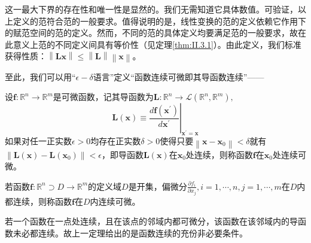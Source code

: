 \documentclass[main.tex]{subfiles}
\begin{document}
这一最大下界的存在性和唯一性是显然的。我们无需知道它具体数值。可验证，以上定义的范符合范的一般要求。值得说明的是，线性变换的范的定义依赖它作用下的赋范空间的范的定义。然而，不同的范的具体定义均要满足范的一般要求，故在此意义上范的不同定义间具有等价性（见定理\ref{thm:II.3.1}）。由此定义，我们标准获得性质：$\left\|\mathbf{Lx}\right\|\leq\left\|\mathbf{L}\right\|\left\|\mathbf{x}\right\|$。

至此，我们可以用“$\epsilon-\delta$语言”定义“函数连续可微即其导函数连续”——

\begin{definition}[连续可微]
设$\mathbf{f}:\mathbb{R}^n\rightarrow\mathbb{R}^m$是可微函数，记其导函数为$\mathbf{L}:\mathbb{R}^n\rightarrow\mathcal{L}\left(\mathbb{R}^n,\mathbb{R}^m\right),$
\[
\mathbf{L}\left(\mathbf{x}\right)\equiv\left.\frac{d\mathbf{f}\left(\mathbf{x}^\prime\right)}{d\mathbf{x}^\prime}\right|_{\mathbf{x^\prime}=\mathbf{x}}
\]
如果对任一正实数$\epsilon>0$均存在正实数$\delta>0$使得只要$\left\|\mathbf{x}-\mathbf{x}_0\right\|<\delta$就有$\left\|\mathbf{L}\left(\mathbf{x}\right)-\mathbf{L}\left(\mathbf{x}_0\right)\right\|<\epsilon$，即导函数$\mathbf{L}\left(\mathbf{x}\right)$在$\mathbf{x}_0$处连续，则称函数$\mathbf{f}$在$\mathbf{x}_0$处连续可微。
\end{definition}

\begin{theorem}
若函数$\mathbf{f}:\mathbb{R}^n\supset D\rightarrow\mathbb{R}^m$的定义域$D$是开集，偏微分$\frac{\partial f_i}{\partial x_j},i=1,\cdots,n,j=1,\cdots,m$在$D$内都连续，则称函数$\mathbf{f}$在$D$内连续可微。
\end{theorem}

若一个函数在一点处连续，且在该点的邻域内都可微分，该函数在该邻域内的导函数未必都连续。故上一定理给出的是函数连续的充份非必要条件。
\end{document}

